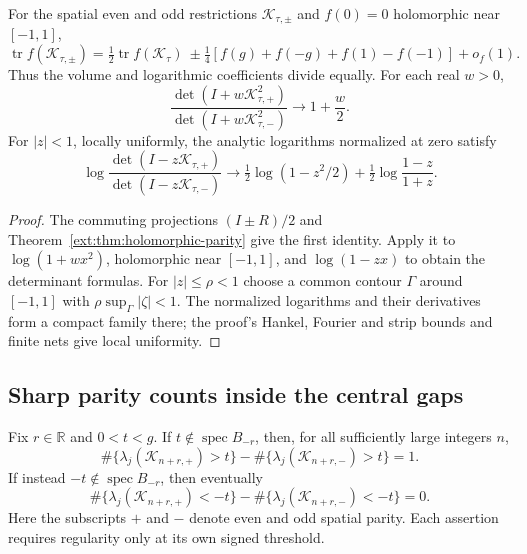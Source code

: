 \begin{corollary}
\label{ext:cor:polynomial-parity-sectors}
\label{ext:cor:parity-determinants}
For the spatial even and odd restrictions $\mathcal K_{\tau,\pm}$ and
$f(0)=0$ holomorphic near $[-1,1]$,
\[
 \operatorname{tr}f(\mathcal K_{\tau,\pm})
 =\tfrac12\operatorname{tr}f(\mathcal K_\tau)
 \ \pm\tfrac14[f(g)+f(-g)+f(1)-f(-1)]+o_f(1).
\]
Thus the volume and logarithmic coefficients divide equally.
For each real $w>0$,
\begin{equation}\label{ext:eq:parity-squared-determinant}
 \frac{\det(I+w\mathcal K_{\tau,+}^{2})}
      {\det(I+w\mathcal K_{\tau,-}^{2})}
 \longrightarrow1+\frac w2.
\end{equation}
For $|z|<1$, locally uniformly, the analytic logarithms normalized at zero
satisfy
\begin{equation}\label{ext:eq:parity-linear-determinant}
 \log\frac{\det(I-z\mathcal K_{\tau,+})}
               {\det(I-z\mathcal K_{\tau,-})}
 \longrightarrow\tfrac12\log(1-z^2/2)
             +\tfrac12\log\frac{1-z}{1+z}.
\end{equation}
\end{corollary}
\begin{proof}
The commuting projections $(I\pm R)/2$ and
Theorem~\ref{ext:thm:holomorphic-parity} give the first identity.
Apply it to $\log(1+wx^2)$, holomorphic near $[-1,1]$, and
$\log(1-zx)$ to obtain the determinant formulas.
For $|z|\le\rho<1$ choose a common contour $\Gamma$ around $[-1,1]$
with $\rho\sup_\Gamma|\zeta|<1$. The normalized logarithms and their
derivatives form a compact family there; the proof's Hankel, Fourier
and strip bounds and finite nets give local uniformity.
\end{proof}

\subsection{Sharp parity counts inside the central gaps}
\label{boundary:sec:sharp-parity}

\begin{theorem}
\label{boundary:thm:sharp-parity}
Fix $r\in\mathbb R$ and $0<t<g$. If $t\notin\operatorname{spec}B_{-r}$,
then, for all sufficiently large integers $n$,
\begin{equation}\label{boundary:eq:positive-sharp-parity}
 \#\{\lambda_j(\mathcal K_{n+r,+})>t\}
 -\#\{\lambda_j(\mathcal K_{n+r,-})>t\}=1.
\end{equation}
If instead $-t\notin\operatorname{spec}B_{-r}$, then eventually
\begin{equation}\label{boundary:eq:negative-sharp-parity}
 \#\{\lambda_j(\mathcal K_{n+r,+})<-t\}
 -\#\{\lambda_j(\mathcal K_{n+r,-})<-t\}=0.
\end{equation}
Here the subscripts $+$ and $-$ denote even and odd spatial parity.
Each assertion requires regularity only at its own signed threshold.
\end{theorem}

